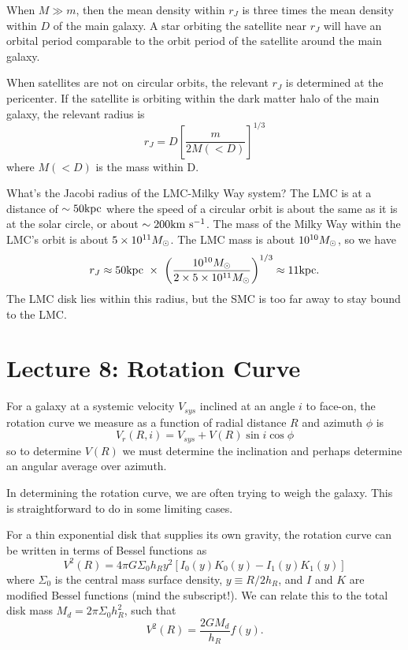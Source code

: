 \documentclass[]{article}
\begin{document}
When $M\gg m$, then the mean density within $r_J$ is three times the mean density within $D$ of the main galaxy.
A star orbiting the satellite near $r_J$ will have an orbital period comparable to the orbit period of the
satellite around the main galaxy.

When satellites are not on circular orbits, the relevant $r_J$ is determined at the pericenter. If the
satellite is orbiting within the dark matter halo of the main galaxy, the relevant radius is
\begin{equation}
r_J = D\left[\frac{m}{2M(<D)}\right]^{1/3}
\end{equation}
where $M(<D)$ is the mass within D.

What's the Jacobi radius of the LMC-Milky Way system? The LMC is at a distance of $\sim50\mathrm{kpc}$ where
the speed of a circular orbit is about the same as it is at the solar circle, or about $\sim200\mathrm{km}~\mathrm{s}^{-1}$.
The mass of the Milky Way within the LMC's orbit is about $5\times10^{11}M_{\odot}$.  The LMC mass is about
$10^{10}M_{\odot}$, so we have
\begin{equation}
r_J\approx 50\mathrm{kpc}~\times~\left(\frac{10^{10}M_{\odot}}{2\times5\times10^{11}M_{\odot}}\right)^{1/3} \approx 11\mathrm{kpc}.
\end{equation}
The LMC disk lies within this radius, but the SMC is too far away to stay bound to the LMC.


\section{Lecture 8: Rotation Curve}

For a galaxy at a systemic velocity $V_{sys}$ inclined at an angle $i$ to face-on, the rotation curve we measure as a function of radial distance $R$ and azimuth $\phi$ is
\begin{equation}
V_r(R,i) = V_{sys} + V(R)\sin i \cos \phi
\end{equation}
\noindent
so to determine $V(R)$ we must determine the inclination and perhaps determine an angular average over azimuth.

In determining the rotation curve, we are often trying to weigh the galaxy.  This is straightforward to do in
some limiting cases.

For a thin exponential disk that supplies its own gravity, the rotation curve can be written in terms of Bessel
functions as
\begin{equation}
V^2(R) = 4\pi G \Sigma_0 h_R y^2 [I_0(y) K_0(y) - I_1(y) K_1(y)]
\end{equation}
\noindent
where $\Sigma_0$ is the central mass surface density, $y\equiv R/2h_R$,
 and $I$ and $K$ are modified Bessel functions (mind the subscript!). We can
relate this to the total disk mass $M_d = 2\pi\Sigma_0 h_R^2$, such that
\begin{equation}
V^2(R) = \frac{2GM_d}{h_R}f(y).
\end{equation}
\end{document}
